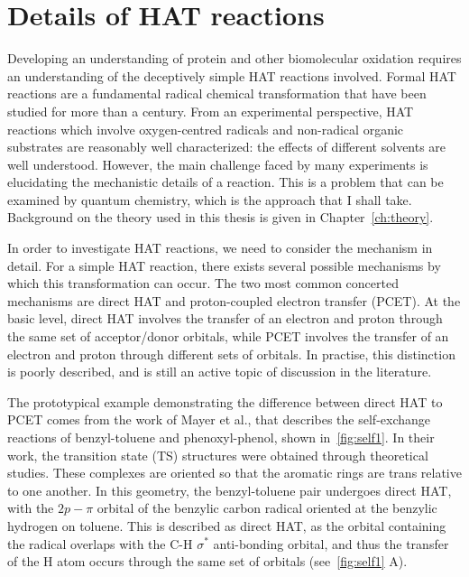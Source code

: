 \section{Details of HAT reactions}

Developing an understanding of protein and other biomolecular oxidation
requires an understanding of the deceptively simple HAT reactions involved.
Formal HAT reactions are a fundamental radical chemical transformation that
have been studied for more than a century.\cite{Kochi1973, Parsons2000} From an
experimental perspective, HAT reactions which involve oxygen-centred radicals
and non-radical organic substrates are reasonably well characterized: the
effects of different solvents are well understood.\cite{Litwinienko2007}
However, the main challenge faced by many experiments is elucidating the
mechanistic details of a reaction. This is a problem that can be examined by
quantum chemistry, which is the approach that I shall take. Background on the
theory used in this thesis is given in Chapter~\ref{ch:theory}.

In order to investigate HAT reactions, we need to consider the mechanism in
detail. For a simple HAT reaction, there exists several possible mechanisms by
which this transformation can occur. The two most common concerted mechanisms
are direct HAT and proton-coupled electron transfer (PCET). At the basic level,
direct HAT involves the transfer of an electron and proton through the same set
of acceptor/donor orbitals, while PCET involves the transfer of an electron and
proton through different sets of orbitals. In practise, this distinction is
poorly described, and is still an active topic of discussion in the
literature.\cite{Cukier1998, Mayer2002, Stubbe2003, Mayer2004, DiLabio2007,
Huynh2007, HammesSchiffer2008, Mayer2010, Weinberg2012, HammesSchiffer2015,
MunozRugeles2017}

The prototypical example demonstrating the difference between direct HAT to
PCET comes from the work of Mayer et al.,\cite{Mayer2002} that describes the
self-exchange reactions of benzyl-toluene and phenoxyl-phenol, shown
in~\ref{fig:self1}. In their work, the transition state (TS) structures were
obtained through theoretical studies. These complexes are oriented so that the
aromatic rings are trans relative to one another. In this geometry, the
benzyl-toluene pair undergoes direct HAT, with the $2p-\pi$ orbital of the
benzylic carbon radical oriented at the benzylic hydrogen on toluene. This is
described as direct HAT, as the orbital containing the radical overlaps with
the C-H $\sigma^*$ anti-bonding orbital, and thus the transfer of the H atom
occurs through the same set of orbitals (see~\ref{fig:self1} A).


